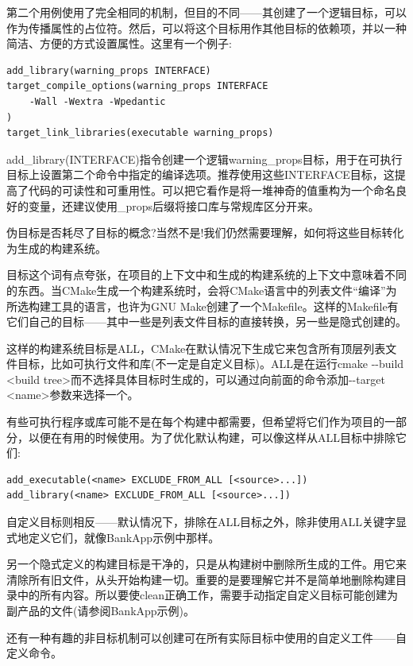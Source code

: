 第二个用例使用了完全相同的机制，但目的不同——其创建了一个逻辑目标，可以作为传播属性的占位符。然后，可以将这个目标用作其他目标的依赖项，并以一种简洁、方便的方式设置属性。这里有一个例子:

\begin{lstlisting}[style=styleCMake]
add_library(warning_props INTERFACE)
target_compile_options(warning_props INTERFACE
	-Wall -Wextra -Wpedantic
)
target_link_libraries(executable warning_props)
\end{lstlisting}

add\_library(INTERFACE)指令创建一个逻辑warning\_props目标，用于在可执行目标上设置第二个命令中指定的编译选项。推荐使用这些INTERFACE目标，这提高了代码的可读性和可重用性。可以把它看作是将一堆神奇的值重构为一个命名良好的变量，还建议使用\_props后缀将接口库与常规库区分开来。

伪目标是否耗尽了目标的概念?当然不是!我们仍然需要理解，如何将这些目标转化为生成的构建系统。


目标这个词有点夸张，在项目的上下文中和生成的构建系统的上下文中意味着不同的东西。当CMake生成一个构建系统时，会将CMake语言中的列表文件“编译”为所选构建工具的语言，也许为GNU Make创建了一个Makefile。这样的Makefile有它们自己的目标——其中一些是列表文件目标的直接转换，另一些是隐式创建的。

这样的构建系统目标是ALL，CMake在默认情况下生成它来包含所有顶层列表文件目标，比如可执行文件和库(不一定是自定义目标)。ALL是在运行cmake -{}-build <build tree>而不选择具体目标时生成的，可以通过向前面的命令添加-{}-target <name>参数来选择一个。

有些可执行程序或库可能不是在每个构建中都需要，但希望将它们作为项目的一部分，以便在有用的时候使用。为了优化默认构建，可以像这样从ALL目标中排除它们:

\begin{lstlisting}[style=styleCMake]
add_executable(<name> EXCLUDE_FROM_ALL [<source>...])
add_library(<name> EXCLUDE_FROM_ALL [<source>...])
\end{lstlisting}

自定义目标则相反——默认情况下，排除在ALL目标之外，除非使用ALL关键字显式地定义它们，就像BankApp示例中那样。

另一个隐式定义的构建目标是干净的，只是从构建树中删除所生成的工件。用它来清除所有旧文件，从头开始构建一切。重要的是要理解它并不是简单地删除构建目录中的所有内容。所以要使clean正确工作，需要手动指定自定义目标可能创建为副产品的文件(请参阅BankApp示例)。

还有一种有趣的非目标机制可以创建可在所有实际目标中使用的自定义工件——自定义命令。

